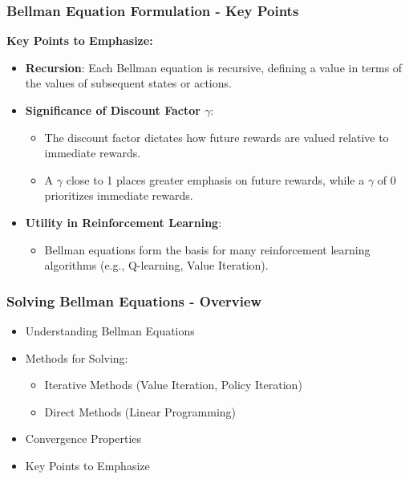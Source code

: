 \documentclass[aspectratio=169]{beamer}
\begin{document}
\begin{frame}[fragile]
  \frametitle{Bellman Equation Formulation - Key Points}
  \textbf{Key Points to Emphasize:}
  \begin{itemize}
    \item \textbf{Recursion}: Each Bellman equation is recursive, defining a value in terms of the values of subsequent states or actions.
    \item \textbf{Significance of Discount Factor \( \gamma \)}: 
    \begin{itemize}
      \item The discount factor dictates how future rewards are valued relative to immediate rewards.
      \item A \( \gamma \) close to 1 places greater emphasis on future rewards, while a \( \gamma \) of 0 prioritizes immediate rewards.
    \end{itemize}
    \item \textbf{Utility in Reinforcement Learning}: 
    \begin{itemize}
      \item Bellman equations form the basis for many reinforcement learning algorithms (e.g., Q-learning, Value Iteration).
    \end{itemize}
  \end{itemize}
\end{frame}

\begin{frame}[fragile]
    \frametitle{Solving Bellman Equations - Overview}
    \begin{itemize}
        \item Understanding Bellman Equations
        \item Methods for Solving:
        \begin{itemize}
            \item Iterative Methods (Value Iteration, Policy Iteration)
            \item Direct Methods (Linear Programming)
        \end{itemize}
        \item Convergence Properties
        \item Key Points to Emphasize
    \end{itemize}
\end{frame}
\end{document}
